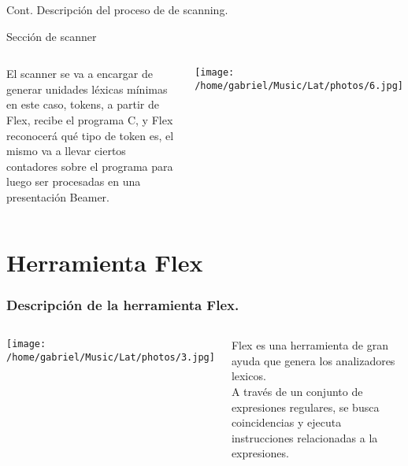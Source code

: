 \documentclass{beamer}
\begin{document}
\begin{frame}{Cont. Descripción del proceso de de scanning.}

\begin{center}
Sección de scanner\\    
\end{center}



\begin{columns}

El scanner se va a encargar de generar unidades léxicas mínimas  en este caso, tokens, a partir de Flex, recibe el programa C, y Flex reconocerá qué tipo de token es, el mismo va a llevar ciertos contadores sobre el programa para luego  ser procesadas en una presentación Beamer.


\begin{center}
    \texttt{[image: /home/gabriel/Music/Lat/photos/6.jpg]}
\end{center}

\end{columns}
\end{frame}


\section{Herramienta Flex }

\begin{frame}
\frametitle{Descripción de la herramienta Flex.}
\begin{columns}


\begin{center}
    \texttt{[image: /home/gabriel/Music/Lat/photos/3.jpg]}
\end{center}


Flex es una herramienta de gran ayuda que genera los analizadores lexicos.\\ 

A través de un conjunto de expresiones regulares, se busca coincidencias y ejecuta
instrucciones relacionadas a la expresiones.\\

\end{columns}

\end{frame}
\end{document}
